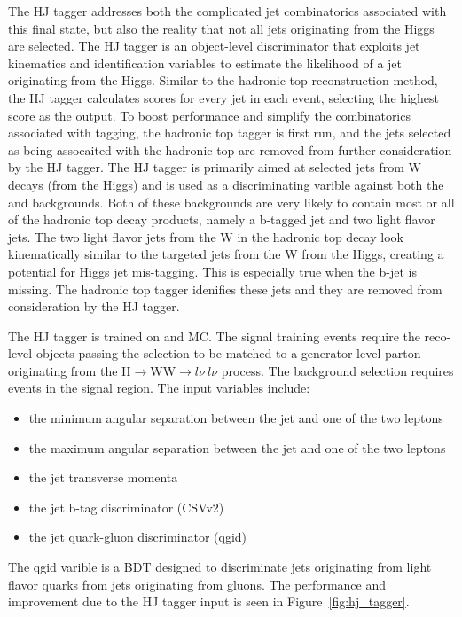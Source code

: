 The HJ tagger addresses both the complicated jet combinatorics associated with this final state, but also the reality that not all jets originating
from the Higgs are selected. The HJ tagger is an object-level discriminator that exploits jet kinematics and identification variables to estimate the likelihood
of a jet originating from the Higgs. Similar to the hadronic top reconstruction method, the HJ tagger calculates scores for every jet in each event, selecting
the highest score as the output. To boost performance and simplify the combinatorics associated with tagging, the hadronic top tagger is first run,
and the jets selected as being assocaited with the hadronic top are removed from further consideration by the HJ tagger.
The HJ tagger is primarily aimed at selected jets from W decays (from the Higgs) and is used as a discriminating varible against both the \ttw and \ttz backgrounds.
Both of these
backgrounds are very likely to contain most or all of the hadronic top decay products, namely a b-tagged jet and two light flavor jets. The two light flavor jets from
the W in the hadronic top decay look kinematically similar to the targeted jets from the W from the Higgs, creating a potential for Higgs jet mis-tagging. This is
especially true when the b-jet is missing. The hadronic top tagger idenifies these jets and they are removed from consideration by the HJ tagger.

The HJ tagger is trained on \tth and \ttv MC. The signal training events require the reco-level objects passing the selection to be matched to a generator-level parton
originating from the H$\rightarrow$WW$\rightarrow l\nu~l\nu$ process. The background selection requires \ttv events in the signal region.  
The input variables include:
\begin{itemize}
\item the minimum angular separation between the jet and one of the two leptons
\item the maximum angular separation between the jet and one of the two leptons
\item the jet transverse momenta
\item the jet b-tag discriminator (CSVv2)
\item the jet quark-gluon discriminator (qgid)
\end{itemize}

\noindent The qgid varible is a BDT designed to discriminate jets originating from light flavor quarks from jets originating from gluons. The performance and improvement due
to the HJ tagger input is seen in Figure~\ref{fig:hj_tagger}.

